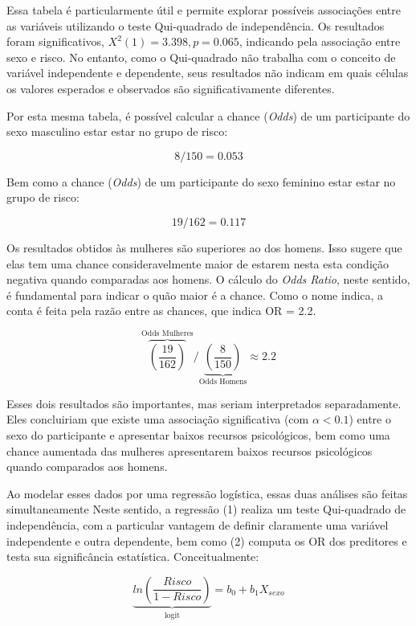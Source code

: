 \documentclass[
]{book}
\begin{document}
Essa tabela é particularmente útil e permite explorar possíveis associações entre as variáveis utilizando o teste Qui-quadrado de independência. Os resultados foram significativos, \(X^2(1) = 3.398, p = 0.065\), indicando pela associação entre sexo e risco. No entanto, como o Qui-quadrado não trabalha com o conceito de variável independente e dependente, seus resultados não indicam em quais células os valores esperados e observados são significativamente diferentes.

Por esta mesma tabela, é possível calcular a chance (\emph{Odds}) de um participante do sexo masculino estar estar no grupo de risco:

\[8/150 = 0.053\]

Bem como a chance (\emph{Odds}) de um participante do sexo feminino estar estar no grupo de risco:

\[19/162 = 0.117\]

Os resultados obtidos às mulheres são superiores ao dos homens. Isso sugere que elas tem uma chance consideravelmente maior de estarem nesta esta condição negativa quando comparadas aos homens. O cálculo do \emph{Odds Ratio}, neste sentido, é fundamental para indicar o quão maior é a chance. Como o nome indica, a conta é feita pela razão entre as chances, que indica OR = 2.2.

\[{\overbrace{\left ( \frac{19}{162}\right)}^\text{Odds Mulheres}}/{\underbrace{\left ( \frac{8}{150} \right)}_\text{Odds Homens}} \approx 2.2\]

Esses dois resultados são importantes, mas seriam interpretados separadamente. Eles concluiriam que existe uma associação significativa (com \(\alpha < 0.1\)) entre o sexo do participante e apresentar baixos recursos psicológicos, bem como uma chance aumentada das mulheres apresentarem baixos recursos psicológicos quando comparados aos homens.

Ao modelar esses dados por uma regressão logística, essas duas análises são feitas simultaneamente Neste sentido, a regressão (1) realiza um teste Qui-quadrado de independência, com a particular vantagem de definir claramente uma variável independente e outra dependente, bem como (2) computa os OR dos preditores e testa sua significância estatística. Conceitualmente:

\[\underbrace{ln\left ( \frac{Risco}{1-Risco} \right)}_\text{logit} = b_0 + b_1X_{sexo}\]
\end{document}
